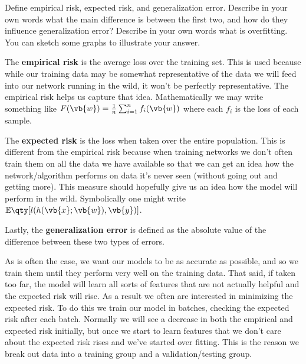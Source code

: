 \documentclass[boxes,pages]{homework}
\begin{document}
\begin{problem}
Define empirical risk, expected risk, and generalization error. Describe in your own words what the main difference is between the first two, and how do they influence generalization error? Describe in your own words what is overfitting. You can sketch some graphs to illustrate your answer.
\end{problem}

\begin{solution}
	The \textbf{empirical risk} is the average loss over the training set. This is used because while our training data may be somewhat representative of the data we will feed into our network running in the wild, it won't be perfectly representative. The empirical risk helps us capture that idea. Mathematically we may write something like $F(\vb{w}) = \frac{1}{n}\sum_{i=1}^nf_i(\vb{w})$ where each $f_i$	is the loss of each sample.

	The \textbf{expected risk} is the loss when taken over the entire population. This is different from the empirical risk because when training networks we don't often train them on all the data we have available so that we can get an idea how the network/algorithm performs on data it's never seen (without going out and getting more). This measure should hopefully give us an idea how the model will perform in the wild. Symbolically one might write $\mathbb{E}\qty[l(h(\vb{x};\vb{w}), \vb{y})]$.

	Lastly, the \textbf{generalization error} is defined as the absolute value of the difference between these two types of errors.

	As is often the case, we want our models to be as accurate as possible, and so we train them until they perform very well on the training data. That said, if taken too far, the model will learn all sorts of features that are not actually helpful and the expected risk will rise. As a result we often are interested in minimizing the expected risk. To do this we train our model in batches, checking the expected risk after each batch. Normally we will see a decrease in both the empirical and expected risk initially, but once we start to learn features that we don't care about the expected risk rises and we've started over fitting. This is the reason we break out data into a training group and a validation/testing group.
\end{solution}
\end{document}
